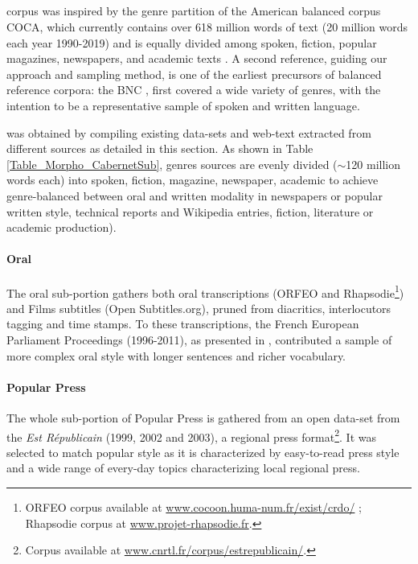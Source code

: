 \subsection{\Cabernet} \label{subsec:DescribeCaBeRnet}

\Cabernet corpus was inspired by the genre partition of the American balanced corpus COCA, %
which currently contains over 618 million words of text (20 million words each year 1990-2019) and is equally divided among spoken, fiction, popular magazines, newspapers, and academic texts \citep{davies-2009-the, davies-2010-the}. A second reference, guiding our approach and sampling method, is one of the earliest precursors of balanced reference corpora: the BNC \citep{bnc-2007-the}, first covered a wide variety of genres, with the intention to be a representative sample of spoken and written language.

\Cabernet was obtained by compiling existing data-sets and web-text extracted from different sources as detailed in this section. As shown in Table \ref{Table_Morpho_CabernetSub}, genres sources are evenly divided ($\sim$120 million words each) into spoken, fiction, magazine, newspaper, academic to achieve genre-balanced between oral and written modality in newspapers or popular written style, technical reports and Wikipedia entries, fiction, literature or academic production).

\paragraph{\Cabernet Oral} \label{subsec:DescribeCaBeRnetOral}
The oral sub-portion gathers both oral transcriptions (\textsc{ORFEO} and Rhapsodie\footnote{\textsc{ORFEO} corpus available at \url{www.cocoon.huma-num.fr/exist/crdo/} ; Rhapsodie corpus at \url{www.projet-rhapsodie.fr}.}) and Films subtitles (Open Subtitles.org), pruned from diacritics, interlocutors tagging and time stamps. To these transcriptions, the French European Parliament Proceedings (1996-2011), as presented in \citet{koehn-2005-europarl}, contributed a sample of more complex oral style with longer sentences and richer vocabulary.%

\paragraph{\Cabernet Popular Press} \label{subsec:DescribeCaBeRnetPop}
The whole sub-portion of Popular Press is gathered from an open data-set from the \textit{Est  Républicain} (1999, 2002 and 2003), a regional press format\footnote{Corpus available at \url{www.cnrtl.fr/corpus/estrepublicain/}.}. %
It was selected to match popular style as it is characterized by easy-to-read press style and a wide range of every-day topics characterizing local regional press.

